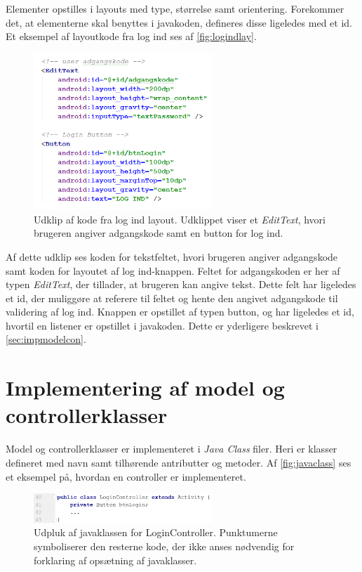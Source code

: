 Elementer opstilles i layouts med type, størrelse samt orientering. Forekommer det, at elementerne skal benyttes i javakoden, defineres disse ligeledes med et id. Et eksempel af layoutkode fra log ind ses af \autoref{fig:logindlay}.

\begin{figure} [H]
\centering
\includegraphics[width=0.6\textwidth]{figures/imple/logindlay}
\caption{Udklip af kode fra log ind layout. Udklippet viser et \textit{EditText}, hvori brugeren angiver adgangskode samt en button for log ind.}
\label{fig:logindlay}
\end{figure}

\noindent
Af dette udklip ses koden for tekstfeltet, hvori brugeren angiver adgangskode samt koden for layoutet af log ind-knappen. Feltet for adgangskoden er her af typen \textit{EditText}, der tillader, at brugeren kan angive tekst. Dette felt har ligeledes et id, der muliggøre at referere til feltet og hente den angivet adgangskode til validering af log ind. Knappen er opstillet af typen button, og har ligeledes et id, hvortil en listener er opstillet i javakoden. Dette er yderligere beskrevet i \autoref{sec:impmodelcon}.

\section{Implementering af model og controllerklasser} \label{sec:impmodelcon}
Model og controllerklasser er implementeret i \textit{Java Class} filer. Heri er klasser defineret med navn samt tilhørende antributter og metoder. Af \autoref{fig:javaclass} ses et eksempel på, hvordan en controller er implementeret. 

\begin{figure} [H]
\centering
\includegraphics[width=0.6\textwidth]{figures/imple/javaclass}
\caption{Udpluk af javaklassen for LoginController. Punktumerne symboliserer den resterne kode, der ikke anses nødvendig for forklaring af opsætning af javaklasser.}
\label{fig:javaclass}
\end{figure}

